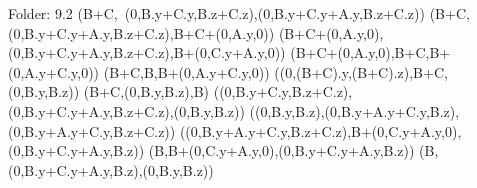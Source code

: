 Folder: 9.2
\left(B+C,\ \left(0,B.y+C.y,B.z+C.z\right),\left(0,B.y+C.y+A.y,B.z+C.z\right)\right)
\left(B+C,\left(0,B.y+C.y+A.y,B.z+C.z\right),B+C+\left(0,A.y,0\right)\right)
\left(B+C+\left(0,A.y,0\right),\left(0,B.y+C.y+A.y,B.z+C.z\right),B+\left(0,C.y+A.y,0\right)\right)
\left(B+C+\left(0,A.y,0\right),B+C,B+\left(0,A.y+C.y,0\right)\right)
\left(B+C,B,B+\left(0,A.y+C.y,0\right)\right)
\left(\left(0,\left(B+C\right).y,\left(B+C\right).z\right),B+C,\left(0,B.y,B.z\right)\right)
\left(B+C,\left(0,B.y,B.z\right),B\right)
\left(\left(0,B.y+C.y,B.z+C.z\right),\left(0,B.y+C.y+A.y,B.z+C.z\right),\left(0,B.y,B.z\right)\right)
\left(\left(0,B.y,B.z\right),\left(0,B.y+A.y+C.y,B.z\right),\left(0,B.y+A.y+C.y,B.z+C.z\right)\right)
\left(\left(0,B.y+A.y+C.y,B.z+C.z\right),B+\left(0,C.y+A.y,0\right),\left(0,B.y+C.y+A.y,B.z\right)\right)
\left(B,B+\left(0,C.y+A.y,0\right),\left(0,B.y+C.y+A.y,B.z\right)\right)
\left(B,\left(0,B.y+C.y+A.y,B.z\right),\left(0,B.y,B.z\right)\right)

